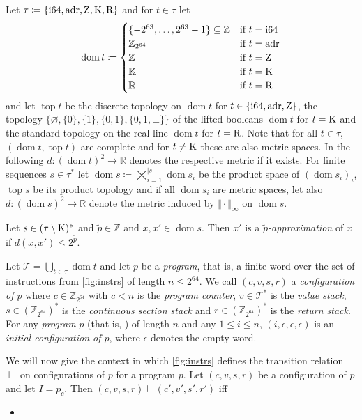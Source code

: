 \documentclass[a4paper,parskip=half]{scrartcl}
\begin{document}
\restoregeometry
\newpage

\newcommand*\dom{\operatorname{dom}}
\newcommand*\Top{\operatorname{top}}

Let $\tau\coloneqq\{\text{i64},\text{adr},\text Z,\text K,\text R\}$ and for
$t\in\tau$ let
\[ \dom t\coloneqq\begin{cases}
	\{-2^{63},\ldots,2^{63}-1\}\subseteq\mathbb Z &\text{if}~t=\text{i64} \\
	\mathbb Z_{2^{64}} &\text{if}~t=\text{adr} \\
	\mathbb Z &\text{if}~t=\text Z \\
	\mathbb K &\text{if}~t=\text K \\
	\mathbb R &\text{if}~t=\text R
\end{cases} \]
and let $\Top t$ be the discrete topology on $\dom t$ for $t\in\{\text{i64},\text{adr},\text Z\}$,
the topology $\{\varnothing,\{0\},\{1\},\{0,1\},\{0,1,\bot\}\}$ of the lifted
booleans $\dom t$ for $t=\text K$ and the standard topology on the real line
$\dom t$ for $t=\text R$. Note that for all $t\in\tau$, $(\dom t,\Top t)$ are
complete and for $t\neq\text K$ these are also metric spaces. In the following
$d:(\dom t)^2\to\mathbb R$ denotes the respective metric if it exists.
For finite sequences $s\in\tau^*$ let
$\dom s\coloneqq\bigtimes_{i=1}^{|s|}\dom s_i$
be the product space of $(\dom s_i)_i$, $\Top s$ be its product topology and
if all $\dom s_i$ are metric spaces, let also $d:(\dom s)^2\to\mathbb R$ denote
the metric induced by $\Vert\cdot\Vert_\infty$ on $\dom s$.


Let $s\in(\tau\setminus\text K)^*$ and $\tilde p\in\mathbb Z$ and $x,x'\in\dom s$.
Then $x'$ is a \emph{$\tilde p$-approximation} of $x$ if
$d(x,x')\leq2^{\tilde p}$.

Let $\mathcal T=\bigcup_{t\in\tau}\dom t$ and let $p$ be a \emph{program}, that
is, a finite word over the set of
instructions from \cref{fig:instrs} of length $n\leq 2^{64}$.
We call $(c,v,s,r)$
a \emph{configuration of $p$} where $c\in\mathbb Z_{2^{64}}$ with $c<n$ is the
\emph{program counter}, $v\in\mathcal T^*$ is the
\emph{value stack}, $s\in(\mathbb Z_{2^{64}})^*$ is the \emph{continuous section
stack} and $r\in(\mathbb Z_{2^{64}})^*$ is the
\emph{return stack}.
For any \emph{program} $p$ (that is, ) of length $n$ and any $1\leq i\leq n$,
$(i,\epsilon,\epsilon,\epsilon)$ is an \emph{initial configuration of $p$},
where $\epsilon$ denotes the empty word.

We will now give the context in which \cref{fig:instrs} defines the transition
relation $\vdash$ on configurations of $p$ for a program $p$. Let $(c,v,s,r)$ be
a configuration of $p$ and let $I=p_c$.
Then $(c,v,s,r)\vdash(c',v',s',r')$ iff
\begin{itemize}
\item
\end{itemize}
\end{document}
